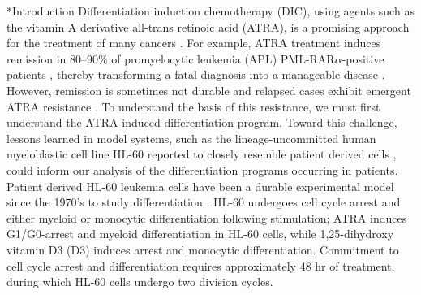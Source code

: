 \documentclass[12pt]{article}
\makeatletter
\renewcommand\section{\@startsection
	{subsection}{2}{0mm}
	{-0.2in}
	{0.05\baselineskip}
	{\normalfont\large\bfseries}}
\makeatother
\begin{document}
\section*{Introduction}
Differentiation induction chemotherapy (DIC), using agents such as the vitamin A derivative all-trans retinoic acid (ATRA),
is a promising approach for the treatment of many cancers \cite{Bushue:2010aa,Tang:2011aa,Cheung:2012aa,Uray:2016aa,Li:2017aa}.
For example, ATRA treatment induces remission in 80–90\% of promyelocytic leukemia (APL) PML-RAR$\alpha$-positive patients \cite{Nilsson:1984aa},
thereby transforming a fatal diagnosis into a manageable disease \cite{Coombs:2015aa}.
However, remission is sometimes not durable and relapsed cases exhibit emergent ATRA resistance \cite{Warrell:1993aa,Freemantle:2003aa}.
To understand the basis of this resistance, we must first understand the ATRA-induced differentiation program.
Toward this challenge, lessons learned in model systems, such as the lineage-uncommitted human myeloblastic cell line HL-60 reported to closely resemble patient derived cells \cite{Harrison:2016aa},
could inform our analysis of the differentiation programs occurring in patients.
Patient derived HL-60 leukemia cells have been a durable experimental model since the 1970’s to study differentiation \cite{Breitman1980}.
HL-60 undergoes cell cycle arrest and either myeloid or monocytic differentiation following stimulation; ATRA induces G1/G0-arrest and myeloid differentiation in HL-60 cells,
while 1,25-dihydroxy vitamin D3 (D3) induces arrest and monocytic differentiation.
Commitment to cell cycle arrest and differentiation requires approximately 48 hr of treatment,
during which HL-60 cells undergo two division cycles.
\end{document}
